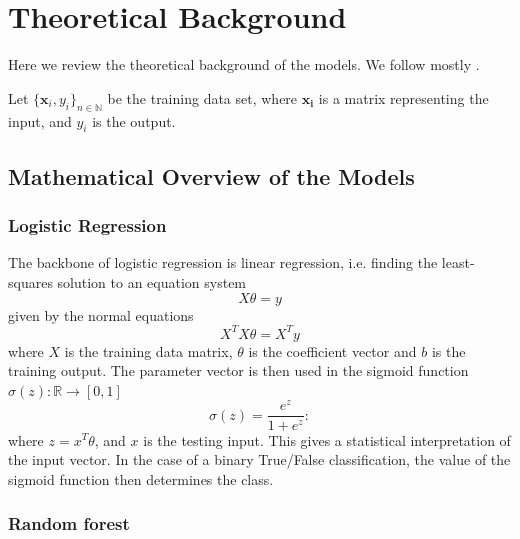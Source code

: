
\section{Theoretical Background}

Here we review the theoretical background of the models. We follow mostly \cite{lindholm2022machine}.

Let $\{ \boldsymbol{x}_i, y_i \}_{n \in \mathbb{N}}$ be the training data set, where $\boldsymbol{x_i}$ is a matrix representing the input, and $y_i$ is the  output.

\subsection{Mathematical Overview of the Models}

    \subsubsection{Logistic Regression}
    The backbone of logistic regression is linear regression, i.e. finding the least-squares solution to an equation system 
    \begin{equation*}
        X\theta = y
    \end{equation*}
    given by the normal equations 
    \begin{equation*}
        X^TX \theta = X^Ty
    \end{equation*}
    where $X$ is the training data matrix, $\theta$ is the coefficient vector and $b$ is the training output. The parameter vector is then used in the sigmoid function $\sigma(z): \mathbb{R}\to [0,1]$
    \begin{equation*}
        \sigma(z) = \frac{e^{z}}{1+e^{z}}:
    \end{equation*}
    where $  z = x^T \theta$, and $x$ is the testing input. This gives a statistical interpretation of the input vector. In the case of a binary True/False classification, the value of the sigmoid function then determines the class.

\subsubsection{Random forest}

